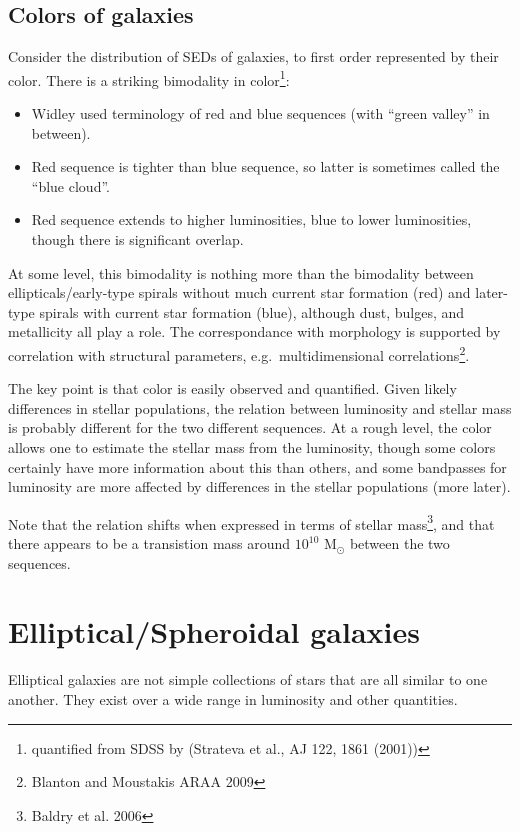 \documentclass{article}
\begin{document}
\subsection{Colors of galaxies}
Consider the distribution of SEDs of galaxies, to first order represented by
their color. There is a striking bimodality in color\footnote{quantified from SDSS
by (Strateva et al., AJ 122, 1861 (2001))}:
\begin{itemize}
    \item Widley used terminology of red and blue sequences
        (with ``green valley'' in between).
    \item Red sequence is tighter than blue sequence, so latter is
        sometimes called the ``blue cloud''.
    \item Red sequence extends to higher luminosities, blue to lower
        luminosities, though there is significant overlap.
\end{itemize}
At some level, this bimodality is nothing more than the bimodality between
ellipticals/early-type spirals without much current star formation (red)
and later-type spirals with current star formation (blue), although
dust, bulges, and metallicity all play a role.
The correspondance with morphology is supported
by correlation with structural parameters, e.g.\ multidimensional
correlations\footnote{Blanton and Moustakis ARAA 2009}.

The key point is that color is easily observed and quantified.  Given likely
differences in stellar populations, the relation between luminosity and stellar
mass is probably different for the two different sequences. At a rough level,
the color allows one to estimate the stellar mass from the luminosity, though
some colors certainly have more information about this than others, and some
bandpasses for luminosity are more affected by differences in the stellar
populations (more later).

Note that the relation shifts when expressed in terms of stellar
mass\footnote{Baldry et al. 2006}, and that there appears to be a transistion
mass around $10^{10}$ M$_{\odot}$ between the two sequences.

\section{Elliptical/Spheroidal galaxies}
Elliptical galaxies are not simple collections of stars that are all
similar to one another. They exist over a wide range in luminosity and
other quantities.
\end{document}
